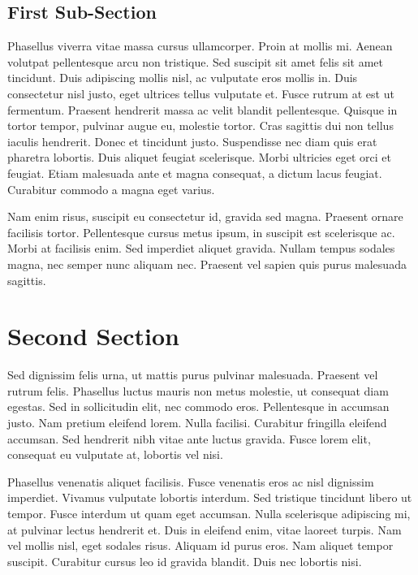 \subsection{First Sub-Section} %

Phasellus viverra vitae massa cursus ullamcorper. Proin at mollis mi. Aenean volutpat pellentesque arcu non tristique. Sed suscipit sit amet felis sit amet tincidunt. Duis adipiscing mollis nisl, ac vulputate eros mollis in. Duis consectetur nisl justo, eget ultrices tellus vulputate et. Fusce rutrum at est ut fermentum. Praesent hendrerit massa ac velit blandit pellentesque. Quisque in tortor tempor, pulvinar augue eu, molestie tortor. Cras sagittis dui non tellus iaculis hendrerit. Donec et tincidunt justo. Suspendisse nec diam quis erat pharetra lobortis. Duis aliquet feugiat scelerisque. Morbi ultricies eget orci et feugiat. Etiam malesuada ante et magna consequat, a dictum lacus feugiat. Curabitur commodo a magna eget varius.

Nam enim risus, suscipit eu consectetur id, gravida sed magna. Praesent ornare facilisis tortor. Pellentesque cursus metus ipsum, in suscipit est scelerisque ac. Morbi at facilisis enim. Sed imperdiet aliquet gravida. Nullam tempus sodales magna, nec semper nunc aliquam nec. Praesent vel sapien quis purus malesuada sagittis.

\section{Second Section} %

Sed dignissim felis urna, ut mattis purus pulvinar malesuada. Praesent vel rutrum felis. Phasellus luctus mauris non metus molestie, ut consequat diam egestas. Sed in sollicitudin elit, nec commodo eros. Pellentesque in accumsan justo. Nam pretium eleifend lorem. Nulla facilisi. Curabitur fringilla eleifend accumsan. Sed hendrerit nibh vitae ante luctus gravida. Fusce lorem elit, consequat eu vulputate at, lobortis vel nisi.

Phasellus venenatis aliquet facilisis. Fusce venenatis eros ac nisl dignissim imperdiet. Vivamus vulputate lobortis interdum. Sed tristique tincidunt libero ut tempor. Fusce interdum ut quam eget accumsan. Nulla scelerisque adipiscing mi, at pulvinar lectus hendrerit et. Duis in eleifend enim, vitae laoreet turpis. Nam vel mollis nisl, eget sodales risus. Aliquam id purus eros. Nam aliquet tempor suscipit. Curabitur cursus leo id gravida blandit. Duis nec lobortis nisi.

